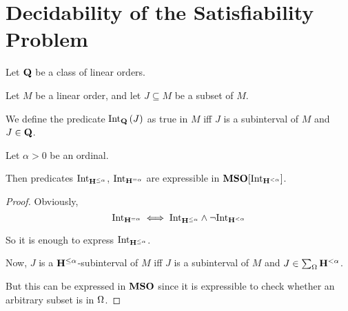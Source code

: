 \section{Decidability of the Satisfiability Problem}

\begin{definition}
  Let $\mathbf{Q}$ be a class of linear orders.

  Let $M$ be a linear order, and let $J \subseteq M$ be a subset of $M$.

  We define the predicate $\mathrm{Int}_{\mathbf{Q}} \left( {J} \right)$ as
  true in $M$ iff $J$ is a subinterval of $M$ and
  $J \in \mathbf{Q}$.
\end{definition}

\begin{lemma}
  Let $\alpha > 0$ be an ordinal.

  Then predicates $\mathrm{Int}_{\mathbf{H}^{\le \alpha}}$, $\mathrm{Int}_{\mathbf{H}^{= \alpha}}$
  are expressible in $\mathbf{MSO}[\mathrm{Int}_{\mathbf{H}^{< \alpha}}]$.
\end{lemma}

\begin{proof}
  Obviously, \[
    \mathrm{Int}_{\mathbf{H}^{= \alpha}}
    \iff \mathrm{Int}_{\mathbf{H}^{\le \alpha}} \wedge \neg \mathrm{Int}_{\mathbf{H}^{< \alpha}}
  \]

  So it is enough to express $\mathrm{Int}_{\mathbf{H}^{\le \alpha}}$.

  Now, $J$ is a $\mathbf{H}^{\le \alpha}$-subinterval of $M$ iff
  $J$ is a subinterval of $M$ and $J \in \sum_{\Omega}{\mathbf{H}^{< \alpha}}$.

  But this can be expressed in $\mathbf{MSO}$ since it is expressible
  to check whether an arbitrary subset is in $\Omega$.
\end{proof}

